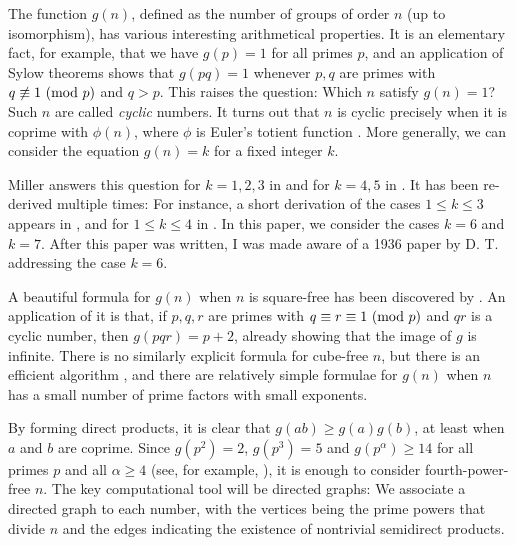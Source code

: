 The function $g(n)$, defined as the number of groups of order $n$ (up to isomorphism), has various interesting arithmetical properties.
It is an elementary fact, for example, that we have $g(p) = 1$ for all primes $p$, and an application of Sylow theorems shows that
$g(pq) = 1$ whenever $p, q$ are primes with $q \not\equiv 1 \ (\mathrm{mod} \ p)$ and $q > p$.
This raises the question: Which $n$ satisfy $g(n) = 1$? Such $n$ are called \emph{cyclic} numbers.
It turns out that $n$ is cyclic precisely when it is coprime with $\phi(n)$, where $\phi$ is Euler's totient function {\cite{szele}}.
More generally, we can consider the equation $g(n) = k$ for a fixed integer $k$.

Miller answers this question for $k = 1, 2, 3$ in {\cite{miller1}} and for $k = 4, 5$ in {\cite{miller2}}.
It has been re-derived multiple times: For instance, a short derivation of the cases $1 \le k \le 3$ appears in {\cite{olsson}},
and for $1 \le k \le 4$ in {\cite{gnumoas}}.
In this paper, we consider the cases $k = 6$ and $k = 7$.
After this paper was written, I was made aware of a 1936 paper by D. T. {\cite{sigley}} addressing the case \mbox{$k = 6$.}

A beautiful formula for $g(n)$ when $n$ is square-free has been discovered by  {\cite[Thm.~5.1]{gnumoas}}.
An application of it is that, if $p, q, r$ are primes with $q \equiv r \equiv 1 \ (\mathrm{mod} \ p)$ and $qr$ is a cyclic number, then $g(pqr) = p + 2$, already showing that the image of $g$ is infinite.
There is no similarly explicit formula for cube-free $n$, but there is an efficient algorithm {\cite{cube-free}},
and there are relatively simple formulae for $g(n)$ when $n$ has a small number of prime factors with small exponents.

By forming direct products, it is clear that $g(ab) \ge g(a)g(b)$, at least when $a$ and $b$ are coprime.
Since \mbox{$g(p^2) = 2$,} $g(p^3) = 5$ and $g(p^\alpha) \ge 14$ for all primes $p$ and all $\alpha \ge 4$
(see, for example, \cite[Thm.~3.1]{gnumoas}), it is enough to consider fourth-power-free $n$.
The key computational tool will be directed graphs: We associate a directed graph to each number,
with the vertices being the prime powers that divide $n$ and the edges indicating the existence of nontrivial semidirect products.